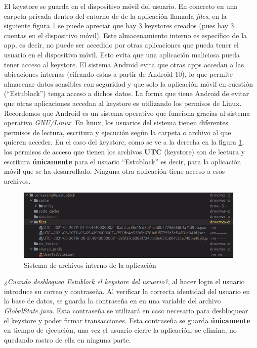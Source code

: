 El keystore se guarda en el dispositivo móvil del usuario. En concreto en una carpeta privada dentro del entorno de de la aplicación llamada \emph{files}, en la siguiente figura \ref{fig:fileSystem} se puede apreciar que hay 3 keystores creados (pues hay 3 cuentas en el dispositivo móvil). Este almacenamiento interno es específico de la app, es decir, no puede ser accedido por otras aplicaciones que pueda tener el usuario en el dispositivo móvil. Esto evita que una aplicación maliciosa pueda tener acceso al keystore. El sistema Android evita que otras apps accedan a las ubicaciones internas (cifrando estas a partir de Android 10), lo que permite almacenar datos sensibles con seguridad y que solo la aplicación móvil en cuestión (``Estublock'') tenga acceso a dichos datos. La forma que tiene Android de evitar que otras aplicaciones accedan al keystore es utilizando los permisos de Linux. Recordemos que Android es un sistema operativo que funciona gracias al sistema operativo \emph{GNU/Linux}\cite{linux}. En linux, los usuarios del sistema tienen diferentes permisos de lectura, escritura y ejecución según la carpeta o archivo al que quieren acceder\cite{usuariosLinux}. En el caso del keystore, como se ve a la derecha en la figura \ref{fig:fileSystem}, los permisos de acceso que tienen los archivos \textbf{UTC} (keystore) son de lectura y escritura \textbf{únicamente} para el usuario ``Estublock'' es decir, para la aplicación móvil que se ha desarrollado. Ninguna otra aplicación tiene acceso a esos archivos. \\

\begin{figure}[h!]
  \centering
  \includegraphics[width=1\linewidth]{figs/Desarrollo/Keystore/fileSystem}
  \caption[Sistema de archivos interno de la aplicación]{Sistema de archivos interno de la aplicación}
  \label{fig:fileSystem}
\end{figure}

\emph{¿Cuando desbloquea Estublock el keystore del usuario?}, al hacer login el usuario introduce su correo y contraseña. Al verificar la correcta identidad del usuario en la base de datos, se guarda la contraseña en en una variable del archivo \emph{GlobalState.java}. Esta contraseña se utilizará en caso necesario para desbloquear el keystore y poder firmar transacciones. Esta contraseña se guarda \textbf{únicamente} en tiempo de ejecución, una vez el usuario cierre la aplicación, se elimina, no quedando rastro de ella en ninguna parte. \\


